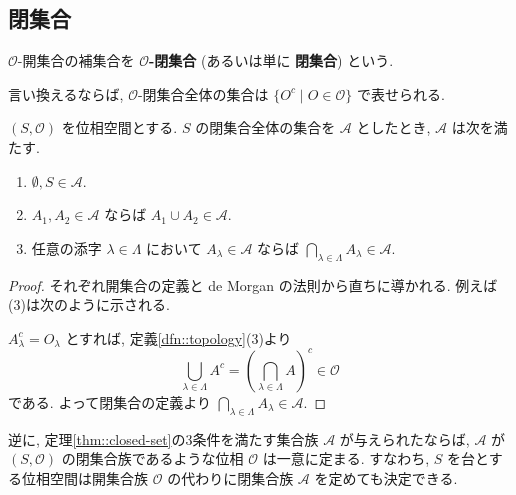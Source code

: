 \subsection{閉集合}

\begin{framed}
    \begin{dfn}[位相の定義と開集合]\label{dfn::closed-set}
        $\mathcal{O}$-開集合の補集合を \textbf{$\mathcal{O}$-閉集合} (あるいは単に \textbf{閉集合}) という.
    \end{dfn}
\end{framed}

言い換えるならば, $\mathcal{O}$-閉集合全体の集合は $\{O^c\mid O\in\mathcal{O}\}$ で表せられる.

\begin{framed}
    \begin{thm}[閉集合]\label{thm::closed-set}
        $(S,\mathcal{O})$ を位相空間とする. $S$ の閉集合全体の集合を $\mathcal{A}$ としたとき, $\mathcal{A}$ は次を満たす.

        \begin{enumerate}
            \item $\displaystyle \emptyset, S\in\mathcal{A}.$
            \item $A_1, A_2\in\mathcal{A}$ ならば $A_1\cup A_2\in\mathcal{A}.$
            \item 任意の添字 $\lambda\in\Lambda$ において $A_\lambda\in\mathcal{A}$ ならば $\displaystyle\bigcap_{\lambda\in\Lambda}A_\lambda\in\mathcal{A}.$
        \end{enumerate}
    \end{thm}
\end{framed}

\begin{proof}
    それぞれ開集合の定義と de Morgan の法則から直ちに導かれる. 例えば(3)は次のように示される.

    $A_\lambda^c=O_\lambda$ とすれば, 定義\ref{dfn::topology}(3)より
    $$\displaystyle\bigcup_{\lambda\in\Lambda}{A^c}=\left(\bigcap_{\lambda\in\Lambda}{A}\right)^c\in\mathcal{O}$$
    である. よって閉集合の定義より $\displaystyle\bigcap_{\lambda\in\Lambda}A_\lambda\in\mathcal{A}.$
\end{proof}

逆に, 定理\ref{thm::closed-set}の3条件を満たす集合族 $\mathcal{A}$ が与えられたならば, $\mathcal{A}$ が $(S, \mathcal{O})$ の閉集合族であるような位相 $\mathcal{O}$ は一意に定まる.
すなわち, $S$ を台とする位相空間は開集合族 $\mathcal{O}$ の代わりに閉集合族 $\mathcal{A}$ を定めても決定できる.


